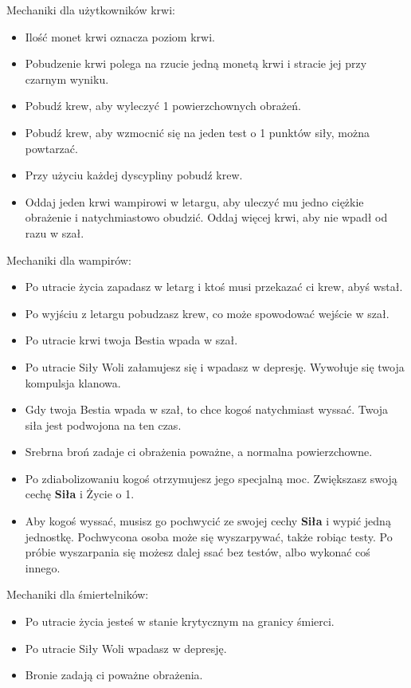 	Mechaniki dla użytkowników krwi:
	\begin{itemize}
		\item Ilość monet krwi oznacza poziom krwi.
		\item Pobudzenie krwi polega na rzucie jedną monetą krwi i stracie jej przy czarnym wyniku.
		\item Pobudź krew, aby wyleczyć 1 powierzchownych obrażeń.
		\item Pobudź krew, aby wzmocnić się na jeden test o 1 punktów siły, można powtarzać.
		\item Przy użyciu każdej dyscypliny pobudź krew.
		\item Oddaj jeden krwi wampirowi w letargu, aby uleczyć mu jedno ciężkie obrażenie i natychmiastowo obudzić. Oddaj więcej krwi, aby nie wpadł od razu w szał.
	\end{itemize}

	Mechaniki dla wampirów:
	\begin{itemize}
		\item Po utracie życia zapadasz w letarg i ktoś musi przekazać ci krew, abyś wstał.
		\item Po wyjściu z letargu pobudzasz krew, co może spowodować wejście w szał.
		\item Po utracie krwi twoja Bestia wpada w szał.
		\item Po utracie Siły Woli załamujesz się i wpadasz w depresję. Wywołuje się twoja kompulsja klanowa.
		\item Gdy twoja Bestia wpada w szał, to chce kogoś natychmiast wyssać. Twoja siła jest podwojona na ten czas.
		\item Srebrna broń zadaje ci obrażenia poważne, a normalna powierzchowne.
		\item Po zdiabolizowaniu kogoś otrzymujesz jego specjalną moc. Zwiększasz swoją cechę \textbf{Siła} i Życie o 1.
		\item Aby kogoś wyssać, musisz go pochwycić ze swojej cechy \textbf{Siła} i wypić jedną jednostkę. Pochwycona osoba może się wyszarpywać, także robiąc testy. Po próbie wyszarpania się możesz dalej ssać bez testów, albo wykonać coś innego.
	\end{itemize}

	Mechaniki dla śmiertelników:
	\begin{itemize}
		\item Po utracie życia jesteś w stanie krytycznym na granicy śmierci.
		\item Po utracie Siły Woli wpadasz w depresję.
		\item Bronie zadają ci poważne obrażenia.
	\end{itemize}

